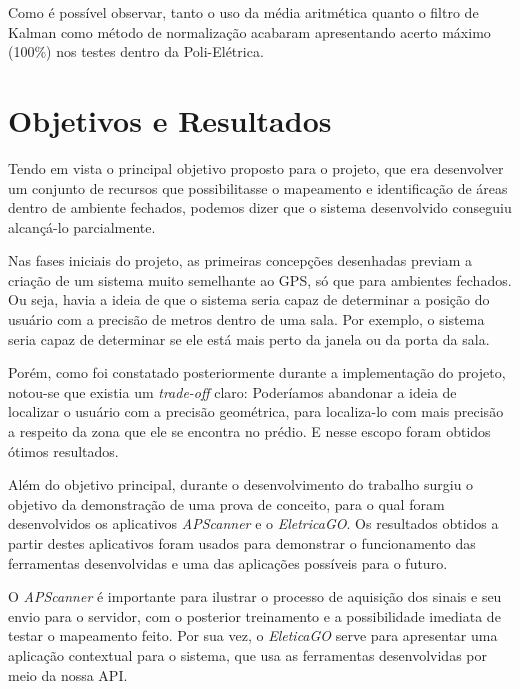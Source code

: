 Como é possível observar, tanto o uso da média aritmética quanto o filtro de Kalman como método de normalização acabaram apresentando acerto máximo (100\%) nos testes dentro da Poli-Elétrica.


\section{Objetivos e Resultados}
Tendo em vista o principal objetivo proposto para o projeto, que era desenvolver um conjunto de recursos que possibilitasse o mapeamento e identificação de áreas dentro de ambiente fechados, podemos dizer que o sistema desenvolvido conseguiu alcançá-lo parcialmente.\par
Nas fases iniciais do projeto, as primeiras concepções desenhadas previam a criação de um sistema muito semelhante ao GPS, só que para ambientes fechados. Ou seja, havia a ideia de que o sistema seria capaz de determinar a posição do usuário com a precisão de metros dentro de uma sala. Por exemplo, o sistema seria capaz de determinar se ele está mais perto da janela ou da porta da sala.\par
Porém, como foi constatado posteriormente durante a implementação do projeto, notou-se que existia um \textit{trade-off} claro: Poderíamos abandonar a ideia de localizar o usuário com a precisão geométrica, para localiza-lo com mais precisão a respeito da zona que ele se encontra no prédio. E nesse escopo foram obtidos ótimos resultados.\par
Além do objetivo principal, durante o desenvolvimento do trabalho surgiu o objetivo da demonstração de uma prova de conceito, para o qual foram desenvolvidos os aplicativos \textit{APScanner} e o \textit{EletricaGO}. Os resultados obtidos a partir destes aplicativos foram usados para demonstrar o funcionamento das ferramentas desenvolvidas e uma das aplicações possíveis para o futuro.\par
O \textit{APScanner} é importante para ilustrar o processo de aquisição dos sinais e seu envio para o servidor, com o posterior treinamento e a possibilidade imediata de testar o mapeamento feito. Por sua vez, o \textit{EleticaGO} serve para apresentar uma aplicação contextual para o sistema, que usa as ferramentas desenvolvidas por meio da nossa API. \par



